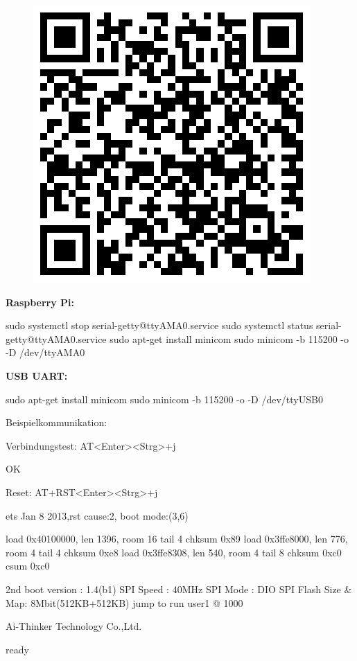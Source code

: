 \begin{figure}[ht]
  \centering
  \includegraphics[scale=0.2]{images/QR_ESP8266_AT-Cmd.png}	
  \label{ESP8266_AT-Cmd}
\end{figure}

 
\textbf{Raspberry Pi:}
\begin{console}
sudo systemctl stop serial-getty@ttyAMA0.service
sudo systemctl status serial-getty@ttyAMA0.service
sudo apt-get install minicom
sudo minicom -b 115200 -o -D /dev/ttyAMA0
\end{console}

\textbf{USB UART:} 
\begin{console}
sudo apt-get install minicom
sudo minicom -b 115200 -o -D /dev/ttyUSB0
\end{console}

Beispielkommunikation:

\begin{console}
Verbindungstest: AT<Enter><Strg>+j
\end{console}
\begin{screensmall}
OK
\end{screensmall}

\begin{console}
Reset: AT+RST<Enter><Strg>+j
\end{console}
\begin{screensmall}
 ets Jan  8 2013,rst cause:2, boot mode:(3,6)

load 0x40100000, len 1396, room 16
tail 4
chksum 0x89
load 0x3ffe8000, len 776, room 4
tail 4
chksum 0xe8
load 0x3ffe8308, len 540, room 4
tail 8
chksum 0xc0
csum 0xc0

2nd boot version : 1.4(b1)
  SPI Speed      : 40MHz
  SPI Mode       : DIO
  SPI Flash Size & Map: 8Mbit(512KB+512KB)
jump to run user1 @ 1000

Ai-Thinker Technology Co.,Ltd.

ready
\end{screensmall}

